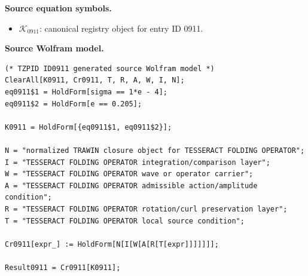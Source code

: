 \begin{minipage}[t]{0.49\linewidth}
\begingroup
\small
\raggedright
\textbf{Source equation symbols.}\par
\begin{itemize}[leftmargin=1.35em,itemsep=1pt,topsep=1pt,parsep=0pt]
    \item $\mathcal{K}_{0911}$: canonical registry object for entry ID 0911.
\end{itemize}
\endgroup
\end{minipage}\hfill
\begin{minipage}[t]{0.47\linewidth}
\begingroup
\scriptsize
\raggedright
\textbf{Source Wolfram model.}\par
\begin{Verbatim}[fontsize=\tiny,breaklines=true,breakanywhere=true]
(* TZPID ID0911 generated source Wolfram model *)
ClearAll[K0911, Cr0911, T, R, A, W, I, N];
eq0911$1 = HoldForm[sigma == 1*e - 4];
eq0911$2 = HoldForm[e == 0.205];

K0911 = HoldForm[{eq0911$1, eq0911$2}];

N = "normalized TRAWIN closure object for TESSERACT FOLDING OPERATOR";
I = "TESSERACT FOLDING OPERATOR integration/comparison layer";
W = "TESSERACT FOLDING OPERATOR wave or operator carrier";
A = "TESSERACT FOLDING OPERATOR admissible action/amplitude condition";
R = "TESSERACT FOLDING OPERATOR rotation/curl preservation layer";
T = "TESSERACT FOLDING OPERATOR local source condition";

Cr0911[expr_] := HoldForm[N[I[W[A[R[T[expr]]]]]]];

Result0911 = Cr0911[K0911];
\end{Verbatim}
\endgroup
\end{minipage}

